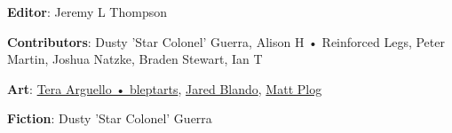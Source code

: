 \begin{description}

\item {\bfseries Editor}: Jeremy L Thompson

\item {\bfseries Contributors}: Dusty 'Star Colonel' Guerra, Alison H • Reinforced Legs, Peter Martin, Joshua Natzke, Braden Stewart, Ian T

\item {\bfseries Art}: \href{https://ko-fi.com/bleptarts}{Tera Arguello • bleptarts}, \href{https://jaredblando.com/}{Jared Blando}, \href{https://www.deviantart.com/mattplog}{Matt Plog}

\item {\bfseries Fiction}: Dusty 'Star Colonel' Guerra

\end{description}
